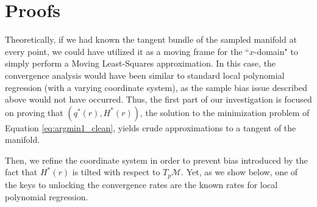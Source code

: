 \documentclass[12pt]{article}
\theoremstyle{remark}
\newcommand{\MM}{\mathcal{M}}
\begin{document}

\section{Proofs}
\label{sec:Proofs}
Theoretically, if we had known the tangent bundle of the sampled manifold at every point, we could have utilized it as a moving frame for the ``$x$-domain" to simply perform  a Moving Least-Squares approximation.
In this case, the convergence analysis would have been similar to standard local polynomial regression \cite{stone1980optimal} (with a varying coordinate system), as the sample bias issue described above would not have occurred. 
Thus, the first part of our investigation is focused on proving that $(q^*(r), H^*(r))$, the solution to the minimization problem of Equation \eqref{eq:argmin1_clean}, yields crude approximations to a tangent of the manifold.

Then, we refine the coordinate system in order to prevent bias introduced by the fact that $H^*(r)$ is tilted with respect to $T_{p}\MM$.
Yet, as we show below, one of the keys to unlocking the convergence rates are the known rates for local polynomial regression.


\end{document}
